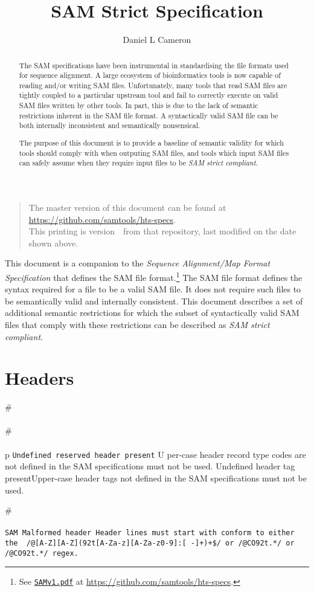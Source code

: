 \documentclass[10pt]{article}
\newcommand{\samrule}{\tt SAM}
\newcommand{\samstrictrule}[3]{
#
	\paragraph{} #3
	{\tt #1}
	#2
}
\begin{document}

\title{SAM Strict Specification}
\author{Daniel L Cameron}
\date{\headdate}
\maketitle
\begin{quote}\small
The master version of this document can be found at
\url{https://github.com/samtools/hts-specs}.\\
This printing is version~\commitdesc\ from that repository,
last modified on the date shown above.
\end{quote}
\vspace*{1em}

\noindent
This document is a companion to the {\sl Sequence Alignment/Map Format
Specification} that defines the SAM file format.\footnote{See
\href{http://samtools.github.io/hts-specs/SAMv1.pdf}{\tt SAMv1.pdf} at \url{https://github.com/samtools/hts-specs}.}
The SAM file format defines the syntax required for a file to be
a valid SAM file. It does not require such files to be semantically
valid and internally consistent.
This document describes a set of additional semantic restrictions
for which the subset of syntactically valid SAM files that comply
with these restrictions can be described as \textit{SAM strict
compliant}.

\renewcommand{\abstractname}{Introduction}
\begin{abstract}

The SAM specifications have been instrumental in standardising
the file formats used for sequence alignment. A large ecosystem of
bioinformatics tools is now capable of reading and/or writing
SAM files. Unfortunately, many tools that read SAM files are tightly
coupled to a particular upstream tool 
and fail to correctly execute on valid SAM files written by other
tools. In part, this is due to the lack of semantic restrictions
inherent in the SAM file format. A syntactically valid SAM file
can be both internally inconsistent and semantically nonsensical.

The purpose of this document is to provide a baseline of semantic
validity for which tools should comply with when outputing SAM
files, and tools which input SAM files can safely assume when
they require input files to be \textit{SAM strict compliant}.

\end{abstract}

\section{Headers}
\samstrictrule{Undefined reserved header present}{Upper-case header record type codes are not defined in the SAM specifications must not be used.}
\samstrictrule{Undefined header tag present}{Upper-case header tags not defined in the SAM specifications must not be used.}
\samstrictrule{Malformed header}{Header lines must start with conform to either the {\tt
  /\char94@[A-Z][A-Z](\char92t[A-Za-z][A-Za-z0-9]:[
  -\char126]+)+\$/} or {\tt /\char94@CO\char92t.*/} or {\tt /\char94@CO\char92t.*/} regex.}{\samrule}
\end{document}
